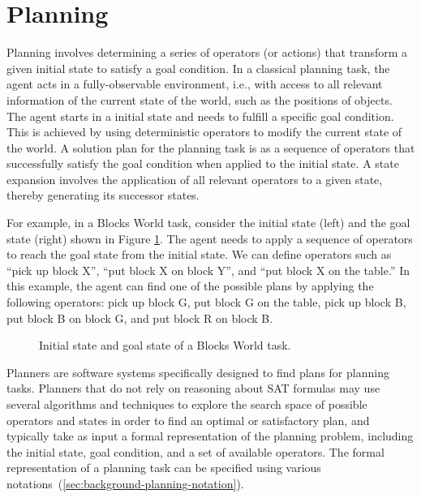 \documentclass[ppgc,diss,english]{iiufrgs}
\begin{document}
\section{Planning}
\label{sec:intro-planning}
Planning involves determining a series of operators (or actions) that transform a given initial state to satisfy a goal condition.
In a classical planning task, the agent acts in a fully-observable environment, i.e., with access to all relevant information of the current state of the world, such as the positions of objects. The agent starts in a initial state and needs to fulfill a specific goal condition. This is achieved by using deterministic operators to modify the current state of the world. A solution plan for the planning task is as a sequence of operators that successfully satisfy the goal condition when applied to the initial state. A state expansion involves the application of all relevant operators to a given state, thereby generating its successor states.

For example, in a Blocks World task, consider the initial state (left) and the goal state (right) shown in Figure \ref{fig:intro-blocks}. The agent needs to apply a sequence of operators to reach the goal state from the initial state. We can define operators such as ``pick up block X'', ``put block X on block Y'', and ``put block X on the table.'' In this example, the agent can find one of the possible plans by applying the following operators: pick up block G, put block G on the table, pick up block B, put block B on block G, and put block R on block B. %

\begin{figure}[ht]
\caption[Initial state of a Blocks World task]{Initial state and goal state of a Blocks World task.}
\vspace{\baselineskip}
\centering
{}
\label{fig:intro-blocks}
\end{figure}

Planners are software systems specifically designed to find plans for planning tasks. Planners that do not rely on reasoning about SAT formulas may use several algorithms and techniques to explore the search space of possible operators and states in order to find an optimal or satisfactory plan, and typically take as input a formal representation of the planning problem, including the initial state, goal condition, and a set of available operators. The formal representation of a planning task can be specified using various notations~(\cref{sec:background-planning-notation}).
\end{document}
